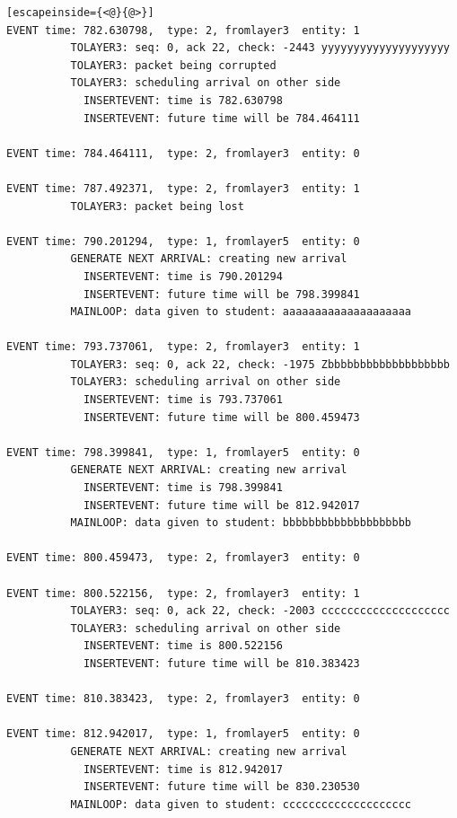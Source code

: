 \documentclass[paper=a4, fontsize=11pt]{scrartcl}
\numberwithin{equation}{section}		%
\numberwithin{figure}{section}			%
\numberwithin{table}{section}				%
\begin{document}
\begin{lstlisting}[escapeinside={<@}{@>}]
EVENT time: 782.630798,  type: 2, fromlayer3  entity: 1
          TOLAYER3: seq: 0, ack 22, check: -2443 yyyyyyyyyyyyyyyyyyyy
          TOLAYER3: packet being corrupted
          TOLAYER3: scheduling arrival on other side
            INSERTEVENT: time is 782.630798
            INSERTEVENT: future time will be 784.464111

EVENT time: 784.464111,  type: 2, fromlayer3  entity: 0

EVENT time: 787.492371,  type: 2, fromlayer3  entity: 1
          TOLAYER3: packet being lost

EVENT time: 790.201294,  type: 1, fromlayer5  entity: 0
          GENERATE NEXT ARRIVAL: creating new arrival
            INSERTEVENT: time is 790.201294
            INSERTEVENT: future time will be 798.399841
          MAINLOOP: data given to student: aaaaaaaaaaaaaaaaaaaa

EVENT time: 793.737061,  type: 2, fromlayer3  entity: 1
          TOLAYER3: seq: 0, ack 22, check: -1975 Zbbbbbbbbbbbbbbbbbbb
          TOLAYER3: scheduling arrival on other side
            INSERTEVENT: time is 793.737061
            INSERTEVENT: future time will be 800.459473

EVENT time: 798.399841,  type: 1, fromlayer5  entity: 0
          GENERATE NEXT ARRIVAL: creating new arrival
            INSERTEVENT: time is 798.399841
            INSERTEVENT: future time will be 812.942017
          MAINLOOP: data given to student: bbbbbbbbbbbbbbbbbbbb

EVENT time: 800.459473,  type: 2, fromlayer3  entity: 0

EVENT time: 800.522156,  type: 2, fromlayer3  entity: 1
          TOLAYER3: seq: 0, ack 22, check: -2003 cccccccccccccccccccc
          TOLAYER3: scheduling arrival on other side
            INSERTEVENT: time is 800.522156
            INSERTEVENT: future time will be 810.383423

EVENT time: 810.383423,  type: 2, fromlayer3  entity: 0

EVENT time: 812.942017,  type: 1, fromlayer5  entity: 0
          GENERATE NEXT ARRIVAL: creating new arrival
            INSERTEVENT: time is 812.942017
            INSERTEVENT: future time will be 830.230530
          MAINLOOP: data given to student: cccccccccccccccccccc


\end{lstlisting}
\end{document}
